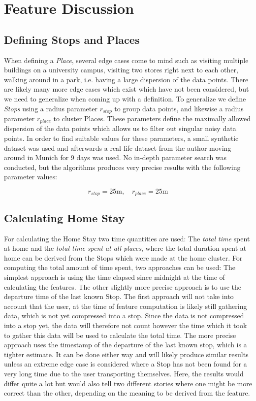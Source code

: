 \section{Feature Discussion}

\subsection{Defining Stops and Places}
When defining a \textit{Place}, several edge cases come to mind such as visiting multiple buildings on a university campus, visiting two stores right next to each other, walking around in a park, i.e. having a large dispersion of the data points. There are likely many more edge cases which exist which have not been considered, but we need to generalize when coming up with a definition. To generalize we define \textit{Stops} using a radius parameter $r_{stop}$ to group data points, and likewise a radius parameter $r_{place}$ to cluster Places. These parameters define the maximally allowed dispersion of the data points which allows us to filter out singular noisy data points. In order to find suitable values for these parameters, a small synthetic dataset was used and afterwards a real-life dataset from the author moving around in Munich for 9 days was used. No in-depth parameter search was conducted, but the algorithms produces very precise results with the following parameter values:

$$r_{stop} = 25 \text{m}, \quad r_{place} = 25 \text{m}$$

\subsection{Calculating Home Stay}
For calculating the Home Stay two time quantities are used: The \textit{total time} spent at home and the\textit{ total time spent at all places}, where the total duration spent at home can be derived from the Stops which were made at the home cluster. For computing the total amount of time spent, two approaches can be used: The simplest approach is using the time elapsed since midnight at the time of calculating the features. The other slightly more precise approach is to use the departure time of the last known Stop. The first approach will not take into account that the user, at the time of feature computation is likely still gathering data, which is not yet compressed into a stop. Since the data is not compressed into a stop yet, the data will therefore not count however the time which it took to gather this data will be used to calculate the total time. The more precise approach uses the timestamp of the departure of the last known stop, which is a tighter estimate. It can be done either way and will likely produce similar results unless an extreme edge case is considered where a Stop has not been found for a very long time due to the user transporting themselves. Here, the results would differ quite a lot but would also tell two different stories where one might be more correct than the other, depending on the meaning to be derived from the feature.

